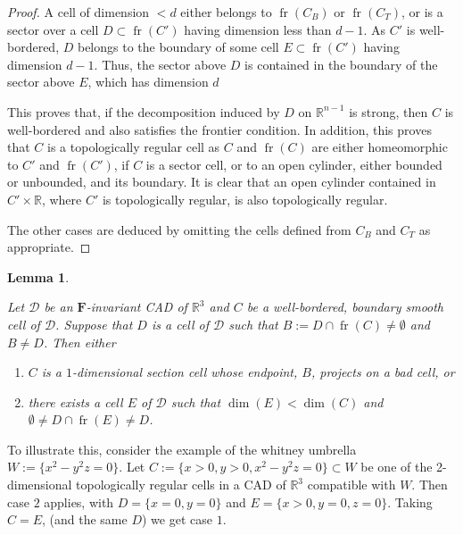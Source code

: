 \documentclass[
]{book}
\providecommand{\tightlist}{%
  \setlength{\itemsep}{0pt}\setlength{\parskip}{0pt}}
\newtheorem{lemma}{Lemma}[chapter]
\theoremstyle{definition}
\theoremstyle{definition}
\theoremstyle{definition}
\theoremstyle{definition}
\theoremstyle{remark}
\begin{document}
\begin{proof}
A cell of dimension \(< d\) either belongs to \({\operatorname{fr} \left( C_B \right)}\) or \({\operatorname{fr} \left( C_T \right)}\), or is a sector over a cell \(D \subset {\operatorname{fr} \left( C' \right)}\) having dimension less than \(d-1\).
As \(C'\) is well-bordered, \(D\) belongs to the boundary of some cell \(E \subset {\operatorname{fr} \left( C' \right)}\) having dimension \(d-1\).
Thus, the sector above \(D\) is contained in the boundary of the sector above \(E\), which has dimension \(d\)

This proves that, if the decomposition induced by \(D\) on \(\mathbb{R}^{n-1}\) is strong, then \(C\) is well-bordered and also satisfies the frontier condition. In addition, this proves that \(C\) is a topologically regular cell as \(C\) and \({\operatorname{fr} \left( C \right)}\) are either homeomorphic to \(C'\) and \({\operatorname{fr} \left( C' \right)}\), if \(C\) is a sector cell, or to an open cylinder, either bounded or unbounded, and its boundary. It is clear that an open cylinder contained in \(C' \times \mathbb{R}\), where \(C'\) is topologically regular, is also topologically regular.

The other cases are deduced by omitting the cells defined from \(C_B\) and \(C_T\) as appropriate.
\end{proof}

\begin{lemma}
\protect\hypertarget{lem:lazard-5-13}{}\label{lem:lazard-5-13}

\citep[ Proposition 5.13]{lazard10}
Let \(\mathcal{D}\) be an \(\mathbf{F}\)-invariant CAD of \(\mathbb{R}^3\) and \(C\) be a well-bordered, boundary smooth cell of \(\mathcal{D}\).
Suppose that \(D\) is a cell of \(\mathcal{D}\) such that \(B := D \cap {\operatorname{fr} \left(  C  \right)} \neq \emptyset\) and \(B \neq D\). Then either

\begin{enumerate}
\def\labelenumi{\arabic{enumi}.}
\tightlist
\item
  \(C\) is a \(1\)-dimensional section cell whose endpoint, \(B\), projects on a bad cell, or
\item
  there exists a cell \(E\) of \(\mathcal{D}\) such that \(\dim(E) < \dim(C)\) and \(\emptyset \neq D \cap {\operatorname{fr} \left(  E  \right)} \neq D\).
\end{enumerate}

\end{lemma}

To illustrate this, consider the example of the whitney umbrella \(W := \{ x^2 - y^2 z = 0 \}\). Let \(C := \{ x > 0, y > 0, x^2 - y^2 z = 0 \} \subset W\) be one of the 2-dimensional topologically regular cells in a CAD of \(\mathbb{R}^3\) compatible with \(W\).
Then case \(2\) applies, with \(D = \{ x = 0, y = 0 \}\) and \(E = \{ x > 0, y = 0, z = 0 \}\).
Taking \(C = E\), (and the same \(D\)) we get case \(1\).
\end{document}
